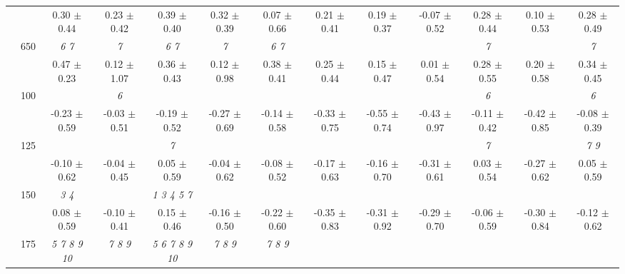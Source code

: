 \begin{table}[h]
{\begin{tabular}{
        ccccccccccccc}
 & & \cellcolor[HTML]{EFEFEF} 0.30 $\pm$ 0.44& \cellcolor[HTML]{EFEFEF} 0.23 $\pm$ 0.42& \cellcolor[HTML]{EFEFEF} 0.39 $\pm$ 0.40& \cellcolor[HTML]{EFEFEF} 0.32 $\pm$ 0.39& \cellcolor[HTML]{EFEFEF} 0.07 $\pm$ 0.66& \cellcolor[HTML]{EFEFEF} 0.21 $\pm$ 0.41& \cellcolor[HTML]{EFEFEF} 0.19 $\pm$ 0.37& \cellcolor[HTML]{EFEFEF} -0.07 $\pm$ 0.52& \cellcolor[HTML]{EFEFEF} 0.28 $\pm$ 0.44& \cellcolor[HTML]{EFEFEF} 0.10 $\pm$ 0.53& \cellcolor[HTML]{EFEFEF} 0.28 $\pm$ 0.49 \\ 
 & \multirow{2}{*}{650}& \textit{ 6 7 }& \textit{ 7 }& \textit{ 6 7 }& \textit{ 7 }& \textit{ 6 7 }& & & & \textit{ 7 }& & \textit{ 7 } \\ 
 & & 0.47 $\pm$ 0.23& 0.12 $\pm$ 1.07& 0.36 $\pm$ 0.43& 0.12 $\pm$ 0.98& 0.38 $\pm$ 0.41& 0.25 $\pm$ 0.44& 0.15 $\pm$ 0.47& 0.01 $\pm$ 0.54& 0.28 $\pm$ 0.55& 0.20 $\pm$ 0.58& 0.34 $\pm$ 0.45 \\ \midrule 
 & \multirow{2}{*}{100}& & \textit{ 6 }& & & & & & & \textit{ 6 }& & \textit{ 6 } \\ 
 & & -0.23 $\pm$ 0.59& -0.03 $\pm$ 0.51& -0.19 $\pm$ 0.52& -0.27 $\pm$ 0.69& -0.14 $\pm$ 0.58& -0.33 $\pm$ 0.75& -0.55 $\pm$ 0.74& -0.43 $\pm$ 0.97& -0.11 $\pm$ 0.42& -0.42 $\pm$ 0.85& -0.08 $\pm$ 0.39 \\ 
 & \multirow{2}{*}{125}& \cellcolor[HTML]{EFEFEF} & \cellcolor[HTML]{EFEFEF} & \cellcolor[HTML]{EFEFEF} \textit{ 7 }& \cellcolor[HTML]{EFEFEF} & \cellcolor[HTML]{EFEFEF} & \cellcolor[HTML]{EFEFEF} & \cellcolor[HTML]{EFEFEF} & \cellcolor[HTML]{EFEFEF} & \cellcolor[HTML]{EFEFEF} \textit{ 7 }& \cellcolor[HTML]{EFEFEF} & \cellcolor[HTML]{EFEFEF} \textit{ 7 9 } \\ 
 & & \cellcolor[HTML]{EFEFEF} -0.10 $\pm$ 0.62& \cellcolor[HTML]{EFEFEF} -0.04 $\pm$ 0.45& \cellcolor[HTML]{EFEFEF} 0.05 $\pm$ 0.59& \cellcolor[HTML]{EFEFEF} -0.04 $\pm$ 0.62& \cellcolor[HTML]{EFEFEF} -0.08 $\pm$ 0.52& \cellcolor[HTML]{EFEFEF} -0.17 $\pm$ 0.63& \cellcolor[HTML]{EFEFEF} -0.16 $\pm$ 0.70& \cellcolor[HTML]{EFEFEF} -0.31 $\pm$ 0.61& \cellcolor[HTML]{EFEFEF} 0.03 $\pm$ 0.54& \cellcolor[HTML]{EFEFEF} -0.27 $\pm$ 0.62& \cellcolor[HTML]{EFEFEF} 0.05 $\pm$ 0.59 \\ 
 & \multirow{2}{*}{150}& \textit{ 3 4 }& & \textit{ 1 3 4 5 7 }& & & & & & & &  \\ 
 & & 0.08 $\pm$ 0.59& -0.10 $\pm$ 0.41& 0.15 $\pm$ 0.46& -0.16 $\pm$ 0.50& -0.22 $\pm$ 0.60& -0.35 $\pm$ 0.83& -0.31 $\pm$ 0.92& -0.29 $\pm$ 0.70& -0.06 $\pm$ 0.59& -0.30 $\pm$ 0.84& -0.12 $\pm$ 0.62 \\ 
 & \multirow{2}{*}{175}& \cellcolor[HTML]{EFEFEF} \textit{  5  7  8  9 10 }& \cellcolor[HTML]{EFEFEF} \textit{ 7 8 9 }& \cellcolor[HTML]{EFEFEF} \textit{  5  6  7  8  9 10 }& \cellcolor[HTML]{EFEFEF} \textit{ 7 8 9 }& \cellcolor[HTML]{EFEFEF} \textit{ 7 8 9 }& \cellcolor[HTML]{EFEFEF} & \cellcolor[HTML]{EFEFEF} & \cellcolor[HTML]{EFEFEF} & \cellcolor[HTML]{EFEFEF} & \cellcolor[HTML]{EFEFEF} & \cellcolor[HTML]{EFEFEF}  \\ 

\end{tabular}}
\end{table}
